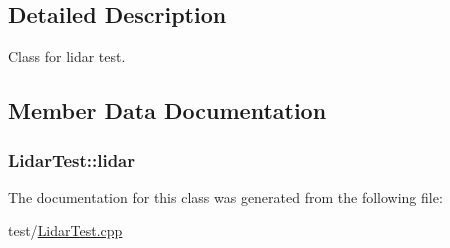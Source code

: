 \subsection{Detailed Description}
Class for lidar test. 

\subsection{Member Data Documentation}
\subsubsection[{\texorpdfstring{lidar}{lidar}}]{ Lidar\+Test\+::lidar\hspace{0.3cm}{\ttfamily [protected]}}\hypertarget{class_lidar_test_ab19e318f3d99df132e015dd8c77c4898}{}\label{class_lidar_test_ab19e318f3d99df132e015dd8c77c4898}


The documentation for this class was generated from the following file\+:\begin{DoxyCompactItemize}
\item 
test/\hyperlink{_lidar_test_8cpp}{Lidar\+Test.\+cpp}\end{DoxyCompactItemize}
